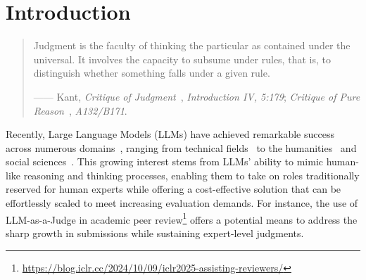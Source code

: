 \documentclass[acmsmall,screen]{acmart}
\begin{document}

\clearpage

\section{Introduction}\label{sec:introduction}


\begin{quote}
\textsf{Judgment is the faculty of thinking the particular as contained under the universal.  
It involves the capacity to subsume under rules, that is, to distinguish whether something falls under a given rule.}  
\begin{flushright}
\footnotesize ------ Kant, \textit{Critique of Judgment}~\citep{kant1790cj}, \textit{Introduction IV, 5:179}; \textit{Critique of Pure Reason}~\citep{kant1781cpr}, \textit{A132/B171}.
\end{flushright}
\end{quote}



Recently, Large Language Models (LLMs) have achieved remarkable success across numerous domains~\cite{inno_new_world}, ranging from technical fields~\cite{inno_aigeo_zhao2024artificial,inno_medicine_tang2024llms,inno_life_science_yuan2023advanced} to the humanities~\cite{inno_cognitive_qu2024promoting,inno_life_science_luo2024artificial,inno_cancer_zhong2023artificial,inno_proteins} and social sciences~\cite{nature_personality_wang2025,inno_science_xu2023artificial,inno_paper_he2023chatgpt,inno_drug_shi2024drug}.  
This growing interest stems from LLMs' ability to mimic human-like reasoning and thinking processes, enabling them to take on roles traditionally reserved for human experts while offering a cost-effective solution that can be effortlessly scaled to meet increasing evaluation demands.
For instance, the use of LLM-as-a-Judge in academic peer review\footnote{\url{https://blog.iclr.cc/2024/10/09/iclr2025-assisting-reviewers/}}  offers a potential means to address the sharp growth in submissions while sustaining expert-level judgments.
\end{document}
